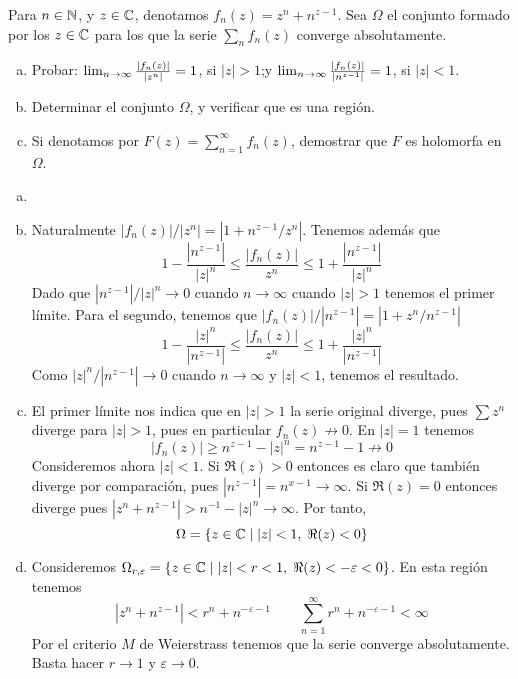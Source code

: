 \documentclass[twoside]{article}
\begin{document}
\newpage
\begin{ejercicio}{6}
Para $n\in\mathbb{N}$, y $z\in\mathbb{C}$, denotamos $f_n(z)=z^n + n^{z-1}$. 
Sea $\Omega$ el conjunto formado por los $z\in\mathbb{C}$ para los que la serie
$\sum_n f_n(z)$ converge absolutamente.
\begin{enumerate}[a)]
\item Probar:  $\lim_{n\to\infty}{|f_n(z)|\over |z^n|}=1$, si $|z|>1$;\quad  y \quad
$\lim_{n\to\infty}{|f_n(z)|\over |n^{z-1}|}=1$, si $|z|<1$.
\item Determinar el conjunto $\Omega$, y verificar que es una
regi\'on.
\item Si denotamos por $F(z)=\sum_{n=1}^\infty f_n(z)$, demostrar que $F$ es holomorfa en $\Omega $.
\end{enumerate}
\end{ejercicio}
\begin{solucion}
\begin{enumerate}[a)]
\item[]
\item Naturalmente $|f_n(z)|/|z^n| = |1 + n^{z-1}/z^n|$. Tenemos además que
$$
1-\frac{|n^{z-1}|}{|z|^n} \leq \frac{|f_n(z)|}{z^n}\leq 1 + \frac{|n^{z-1}|}{|z|^n}
$$
Dado que $|n^{z-1}|/|z|^n\to 0$ cuando $n\to \infty$ cuando $|z|>1$ tenemos el primer límite. Para el segundo, tenemos que $|f_n(z)|/|n^{z-1}| = |1 + z^n/n^{z-1}|$ 
$$
1-\frac{|z|^n}{|n^{z-1}|} \leq \frac{|f_n(z)|}{z^n}\leq 1 + \frac{|z|^n}{|n^{z-1}|}
$$
Como $|z|^n/|n^{z-1}| \to 0$ cuando $n\to \infty$ y $|z|<1$, tenemos el resultado.
\item El primer límite nos indica que en $|z|>1$ la serie original diverge, pues $\sum z^n$ diverge para $|z|>1$, pues en particular $f_n(z) \not \to 0$. En $|z|=1$ tenemos
$$
|f_n(z)| \geq n^{z-1}-|z|^n  = n^{z-1} - 1 \not\to 0
$$ 
Consideremos ahora $|z|<1$. Si $\Re(z)>0$ entonces es claro que también diverge por comparación, pues $|n^{z-1}| = n^{x-1} \to \infty$. Si $\Re(z)=0$ entonces diverge pues $|z^n+n^{z-1}| > n^{-1} - |z|^n \to \infty$. Por tanto, 
$$
\Omega = \{z\in \mathbb{C} \mid |z|<1,\; \Re(z)<0\}
$$
\item Consideremos $\Omega_{r,\varepsilon} = \{z\in \mathbb{C} \mid |z|<r<1,\; \Re(z)<-\varepsilon<0\}$. En esta región tenemos
$$
|z^n+n^{z-1}| < r^n + n^{-\varepsilon-1} \qquad \sum_{n=1}^\infty r^n + n^{-\varepsilon-1} < \infty
$$
Por el criterio $M$ de Weierstrass tenemos que la serie converge absolutamente. Basta hacer $r\to 1$ y $\varepsilon\to 0$.
\end{enumerate}
\end{solucion}
\end{document}
